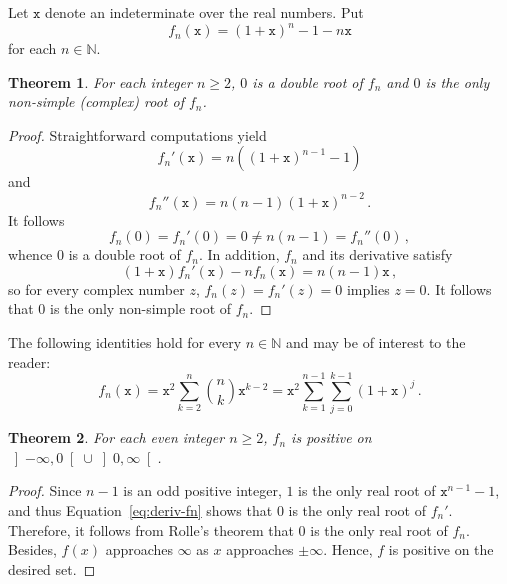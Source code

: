 \documentclass[12pt]{article}
\newcommand{\bN}{\mathbb{N}}
\newcommand{\ttx}{\mathtt{x}}
\newtheorem{theorem}{Theorem}
\begin{document}
\sloppy

Let  $\ttx$ denote an indeterminate over the real numbers.
Put
$$
f_n(\ttx) = {(1 + \ttx)}^n - 1 - n \ttx 
$$
for each $n \in \bN$.

\begin{theorem} \label{thm:root-mult}
  For each integer $n \ge 2$,
  $0$ is a double root of $f_n$ and $0$ is the only non-simple (complex) root of $f_n$.
\end{theorem}

\begin{proof}
  Straightforward computations yield
  \begin{equation} \label{eq:deriv-fn} 
  f_n'(\ttx)  = n \left( {(1 + \ttx)}^{n - 1} -  1 \right) 
  \end{equation}
  and
  $$
  f_n''(\ttx)  = n (n - 1) {(1 + \ttx)}^{n - 2} \,.
  $$
  It follows
  $$
  f_n(0) = f_n'(0) = 0 \ne n (n - 1) = f_n''(0) \, ,
  $$
  whence $0$ is a double root of $f_n$.
  In addition, $f_n$ and its derivative satisfy 
   $$
   (1 + \ttx) f_n'(\ttx) - n f_n(\ttx) = n (n - 1) \ttx \, ,
   $$
   so for every complex number $z$, $f_n(z) = f_n'(z) = 0$ implies $z = 0$.
   It follows that $0$ is the only non-simple root of $f_n$.
 \end{proof}

 The following identities hold for every $n \in \bN$ and may be of interest to the reader:
 $$
 f_n (\ttx)
 = \ttx^2 \sum_{k = 2}^n \binom{n}{k} \ttx^{k - 2}
 = \ttx^2 \sum_{k = 1}^{n - 1}  \sum_{j = 0}^{k - 1} {(1 + \ttx)}^j \, .  
 $$



 \begin{theorem} \label{thm:n-is-even}
   For each even integer $n \ge 2$,
   $f_n$ is positive on $\left]- \infty, 0 \right[ \cup \left]0, \infty \right[$.
 \end{theorem}

 \begin{proof}
   Since $n - 1$ is an odd positive integer,
   $1$ is the only real root of $\ttx^{n - 1} - 1$, 
   and thus Equation~\eqref{eq:deriv-fn} shows that $0$ is the only real root of $f_n'$.
   Therefore, it follows from Rolle's theorem that $0$ is the only real root of $f_n$.
   Besides, $f(x)$ approaches $\infty$ as $x$ approaches $\pm \infty$.
   Hence, $f$ is positive on the desired set.
 \end{proof}
\end{document}
